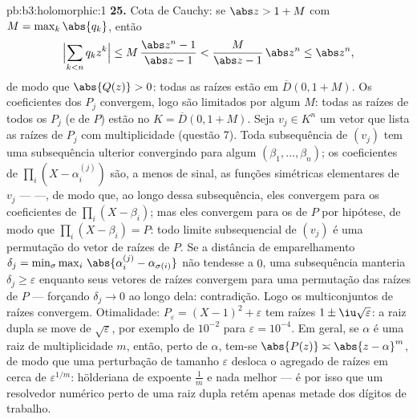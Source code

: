 \begin{solution}{pb:b3:holomorphic:1}
\textbf{25.} Cota de Cauchy: se $\abs z > 1 + M$ com $M =
\max_k\abs{q_k}$, então
\[
\Bigl|\sum_{k<n}q_kz^k\Bigr|
\leq M\,\frac{\abs z^n - 1}{\abs z - 1}
< \frac{M}{\abs z - 1}\,\abs z^n \leq \abs z^n,
\]
de modo que $\abs{Q(z)} > 0$: todas as raízes estão em $\overline D(0, 1+M)$.
Os coeficientes dos $P_j$ convergem, logo são limitados por
algum $M$: todas as raízes de todos os $P_j$ (e de $P$) estão no
 $K = \overline D(0, 1 + M)$. Seja $v_j \in K^n$ um
vetor que lista as raízes de $P_j$ com multiplicidade
(questão 7). Toda subsequência de $(v_j)$ tem uma
subsequência ulterior convergindo para algum $(\beta_1, \dots, \beta_n)$;
os coeficientes de $\prod_i(X - \alpha_i^{(j)})$ são, a menos de
sinal, as funções simétricas elementares de $v_j$ ---
 ---, de modo que, ao longo dessa subsequência, eles convergem para
os coeficientes de $\prod_i(X - \beta_i)$; mas eles
convergem para os de $P$ por hipótese, de modo que $\prod_i(X -
\beta_i) = P$: todo limite subsequencial de $(v_j)$ é uma
permutação do vetor de raízes de $P$. Se a distância
de emparelhamento $\delta_j = \min_\sigma\max_i\,
\abs{\alpha_i^{(j)} - \alpha_{\sigma(i)}}$ não tendesse a
$0$, uma subsequência manteria $\delta_j \geq \varepsilon$
enquanto seus vetores de raízes convergem para uma permutação das
raízes de $P$ --- forçando $\delta_j \to 0$ ao longo dela:
contradição. Logo os multiconjuntos de raízes convergem. Otimalidade:
$P_\varepsilon = (X - 1)^2 + \varepsilon$ tem raízes $1 \pm
\iu\sqrt\varepsilon$: a raiz dupla se move de
$\sqrt\varepsilon$, por exemplo de $10^{-2}$ para $\varepsilon =
10^{-4}$. Em geral, se $\alpha$ é uma raiz de multiplicidade $m$, então,
perto de $\alpha$, tem-se $\abs{P(z)} \asymp \abs{z -
\alpha}^m$, de modo que uma perturbação de tamanho $\varepsilon$ desloca
o agregado de raízes em cerca de $\varepsilon^{1/m}$: 
hölderiana de expoente $\frac1m$ e nada melhor --- é por isso
que um resolvedor numérico perto de uma raiz dupla retém apenas metade
dos dígitos de trabalho.
\end{solution}
